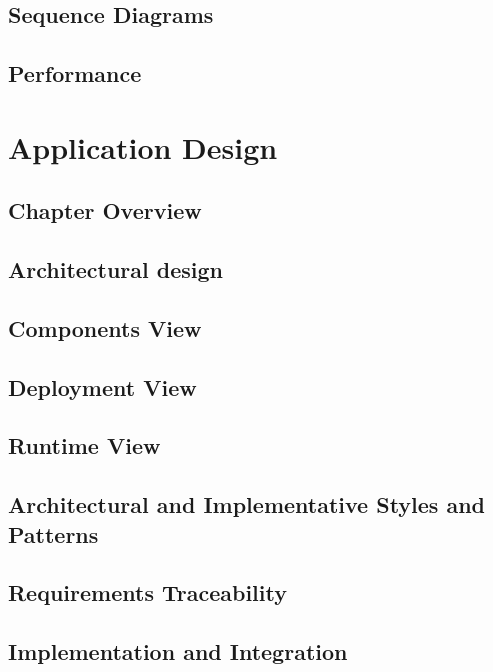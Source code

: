 \documentclass[]{article}
\begin{document}
\subsection{Sequence Diagrams}
\subsection{Performance}
\newpage
\section{Application Design}
\subsection{Chapter Overview}

\subsection{Architectural design}
\subsection{Components View}
\subsection{Deployment View}
\subsection{Runtime View}
\subsection{Architectural and Implementative Styles and Patterns}
\subsection{Requirements Traceability}
\subsection{Implementation and Integration}
\end{document}
